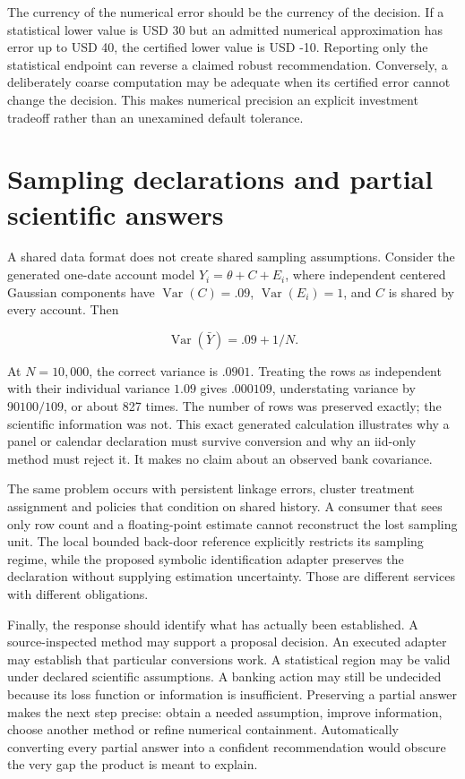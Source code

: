 The currency of the numerical error should be the currency of the
decision. If a statistical lower value is USD 30 but an admitted
numerical approximation has error up to USD 40, the certified lower
value is USD -10. Reporting only the statistical endpoint can reverse a
claimed robust recommendation. Conversely, a deliberately coarse
computation may be adequate when its certified error cannot change the
decision. This makes numerical precision an explicit investment tradeoff
rather than an unexamined default tolerance.

\hypertarget{sampling-declarations-and-partial-scientific-answers}{%
\section{Sampling declarations and partial scientific
answers}\label{sampling-declarations-and-partial-scientific-answers}}

A shared data format does not create shared sampling assumptions.
Consider the generated one-date account model \(Y_i=\theta+C+E_i\),
where independent centered Gaussian components have
\(\operatorname{Var}(C)=.09\), \(\operatorname{Var}(E_i)=1\), and \(C\)
is shared by every account. Then

\[
 \operatorname{Var}(\bar Y)=.09+1/N.
\]

At \(N=10{,}000\), the correct variance is \(.0901\). Treating the rows
as independent with their individual variance \(1.09\) gives
\(.000109\), understating variance by \(90100/109\), or about 827 times.
The number of rows was preserved exactly; the scientific information was
not. This exact generated calculation illustrates why a panel or
calendar declaration must survive conversion and why an iid-only method
must reject it. It makes no claim about an observed bank covariance.
\citep{exec13_interchange_examples}

The same problem occurs with persistent linkage errors, cluster
treatment assignment and policies that condition on shared history. A
consumer that sees only row count and a floating-point estimate cannot
reconstruct the lost sampling unit. The local bounded back-door
reference explicitly restricts its sampling regime, while the proposed
symbolic identification adapter preserves the declaration without
supplying estimation uncertainty. Those are different services with
different obligations.
\citep{exec13_interchange_runtime,exec13_y0_contract}

Finally, the response should identify what has actually been
established. A source-inspected method may support a proposal decision.
An executed adapter may establish that particular conversions work. A
statistical region may be valid under declared scientific assumptions. A
banking action may still be undecided because its loss function or
information is insufficient. Preserving a partial answer makes the next
step precise: obtain a needed assumption, improve information, choose
another method or refine numerical containment. Automatically converting
every partial answer into a confident recommendation would obscure the
very gap the product is meant to explain.
